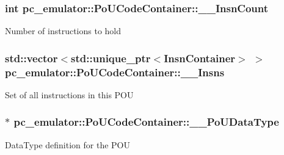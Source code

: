 \subsubsection[{\texorpdfstring{\+\_\+\+\_\+\+Insn\+Count}{__InsnCount}}]{\setlength{\rightskip}{0pt plus 5cm}int pc\+\_\+emulator\+::\+Po\+U\+Code\+Container\+::\+\_\+\+\_\+\+Insn\+Count}\hypertarget{classpc__emulator_1_1PoUCodeContainer_a9cbc804c2057ce5c717b3af07bc4cea6}{}\label{classpc__emulator_1_1PoUCodeContainer_a9cbc804c2057ce5c717b3af07bc4cea6}
Number of instructions to hold 
\subsubsection[{\texorpdfstring{\+\_\+\+\_\+\+Insns}{__Insns}}]{\setlength{\rightskip}{0pt plus 5cm}std\+::vector$<$std\+::unique\+\_\+ptr$<${\bf Insn\+Container}$>$ $>$ pc\+\_\+emulator\+::\+Po\+U\+Code\+Container\+::\+\_\+\+\_\+\+Insns}\hypertarget{classpc__emulator_1_1PoUCodeContainer_abf911d123b0145553af13b7d01a9b172}{}\label{classpc__emulator_1_1PoUCodeContainer_abf911d123b0145553af13b7d01a9b172}
Set of all instructions in this P\+OU 
\subsubsection[{\texorpdfstring{\+\_\+\+\_\+\+Po\+U\+Data\+Type}{__PoUDataType}}]{$\ast$ pc\+\_\+emulator\+::\+Po\+U\+Code\+Container\+::\+\_\+\+\_\+\+Po\+U\+Data\+Type}\hypertarget{classpc__emulator_1_1PoUCodeContainer_a99ec39aa050f16be539dd318f7484ba0}{}\label{classpc__emulator_1_1PoUCodeContainer_a99ec39aa050f16be539dd318f7484ba0}
Data\+Type definition for the P\+OU 
